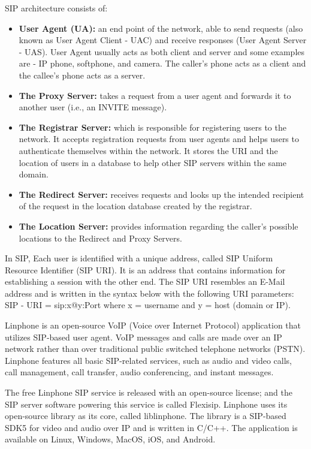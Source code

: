    \noindent SIP architecture consists of:
    \begin{itemize}
        \item \textbf {User Agent (UA):} an end point of the network, able to send requests (also known as User Agent Client - UAC) 
        and receive responses (User Agent Server - UAS). User Agent usually acts as both client and server and some examples 
        are - IP phone, softphone, and camera. The caller’s phone acts as a client and the callee’s phone acts as a server.
        \item \textbf {The Proxy Server:} takes a request from a user agent and forwards it to another user (i.e., an INVITE message).
        \item \textbf {The Registrar Server:} which is responsible for registering users to the network. It accepts registration requests from 
        user agents and helps users to authenticate themselves within the network. It stores the URI and the location of users in a database 
        to help other SIP servers within the same domain.
        \item \textbf {The Redirect Server:} receives requests and looks up the intended recipient of the request in the location database created by the registrar. 
        \item \textbf {The Location Server:} provides information regarding the caller’s possible locations to the Redirect and Proxy Servers.
    \end{itemize}
    \noindent In SIP, Each user is identified with a unique address, called SIP Uniform Resource Identifier (SIP URI). It is an address that contains information for establishing a session with the other end. The SIP URI resembles an E-Mail address and is written in the syntax below with the following URI parameters: 
    SIP - URI = sip:x@y:Port  where x = username and y = host (domain or IP).

    Linphone is an open-source VoIP (Voice over Internet Protocol) application that utilizes SIP-based user agent. VoIP messages and calls are made over an IP network rather than over traditional public switched telephone networks (PSTN). 
    Linphone features all basic SIP-related services, such as audio and video calls, call management, call transfer, audio conferencing, and instant messages. 

    The free Linphone SIP service is released with an open-source license; and the SIP server software powering this service is called Flexisip. 
    Linphone uses its open-source library as its core, called liblinphone. 
    The library is a SIP-based SDK5 for video and audio over IP and is written in C/C++. 
    The application is available on Linux, Windows, MacOS, iOS, and Android. \\

